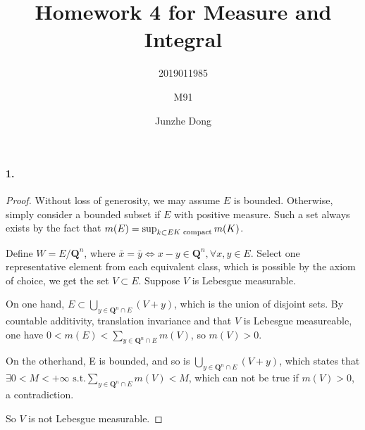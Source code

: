 \documentclass{article}
\author{2019011985\and M91\and Junzhe Dong}
\title{Homework 4 for Measure and Integral}
\begin{document}
\maketitle
\newcommand{\st}{\text{ s.t.}}
\newcommand{\dd}{\,\mathrm{d}}
\newcommand{\re}{\mathrm{Re}\,}
\newcommand{\im}{\mathrm{Im}\,}
\newcommand{\sip}{\mathrm{Simp}}

\DeclareRobustCommand{\rchi}{{\mathpalette\irchi\relax}}
\newcommand{\irchi}[2]{\raisebox{\depth}{$#1\chi$}} 

\paragraph{1.}
\begin{proof}
Without loss of generosity, we may assume $E$ is bounded. Otherwise, simply consider a bounded subset if $E$ with positive measure. Such a set always exists by the fact that $m(E)=\sup_{\substack{k\subset E}\\K\text{ compact}}m(K)$.

Define $W=E/\mathbf{Q}^n$, where $\bar{x}=\bar{y}\Leftrightarrow x-y\in \mathbf{Q}^n, \forall x,y\in E$. Select one representative element from each equivalent class, which is possible by the axiom of choice, we get the set $V\subset E$. Suppose $V$ is Lebesgue measurable.

On one hand, $E\subset\bigcup\limits_{y\in \mathbf{Q}^n\cap E}(V+y)$, which is the union of disjoint sets. By countable additivity, translation invariance and that $V$ is Lebesgue measureable, one have $0<m(E)<\sum\limits_{y\in \mathbf{Q}^n\cap E}m(V)$, so $m(V)>0$.

On the otherhand, E is bounded, and so is $\bigcup\limits_{y\in \mathbf{Q}^n\cap E}(V+y)$, which states that $\exists 0<M<+\infty\st\sum\limits_{y\in \mathbf{Q}^n\cap E}m(V)<M$, which can not be true if $m(V)>0$, a contradiction. 

So $V$ is not Lebesgue measurable.
\end{proof}
\end{document}
